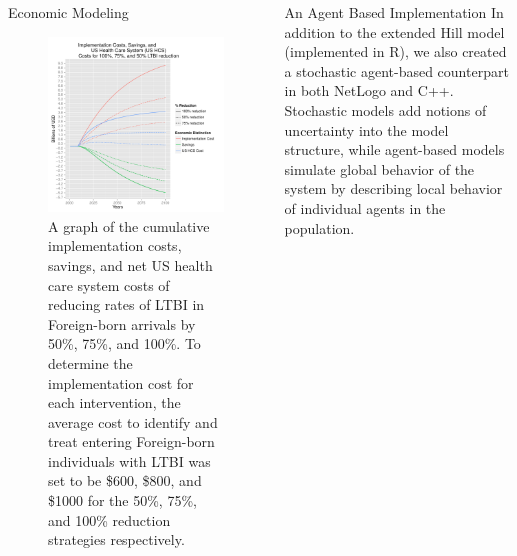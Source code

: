\documentclass[final]{beamer}
\begin{document}
\begin{frame}
\begin{columns}
\begin{column}{.3\textwidth}
\begin{block}{Economic Modeling}
        \begin{figure}[h]
          \begin{center}
            \includegraphics[scale=1]{EnLTBIRedGroupCost.pdf}
          \end{center}
          \caption{A graph of the cumulative implementation costs, savings, and 
                       net US health care system costs of reducing rates of LTBI in
                       Foreign-born arrivals by 50\%, 75\%, and 100\%.  To determine the 
                       implementation cost for each intervention, the average cost
                       to identify and treat entering Foreign-born individuals with LTBI
                       was set to be \$600, \$800, and \$1000 for the 50\%, 75\%, 
                       and 100\% reduction strategies respectively.}
          \label{fig:redEnLTBI_costs}
        \end{figure}
      \end{block}
    \end{column}
    \begin{column}{.3\textwidth}
      \begin{block}{An Agent Based Implementation}
        In addition to the extended Hill model (implemented in R), we also
        created a stochastic agent-based counterpart in both NetLogo and C++.
        Stochastic models add notions of uncertainty into the model structure,
        while agent-based models simulate global behavior of the system by
        describing local behavior of individual agents in the population.


\end{block}
\end{column}
\end{columns}
\end{frame}
\end{document}
